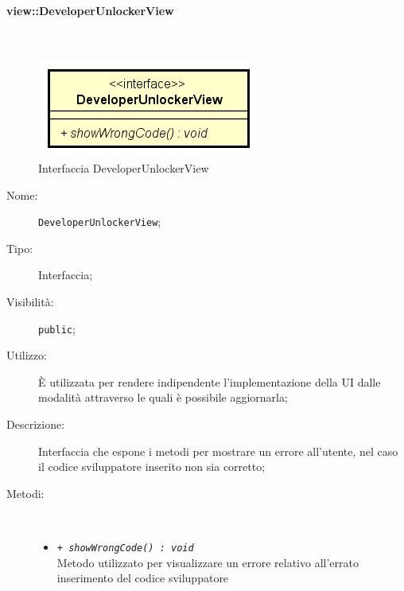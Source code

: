 \documentclass[../DefinizioneDiProdotto.tex]{subfiles}
\begin{document}
\paragraph{view::DeveloperUnlockerView}
\
\begin{figure}[H]
	\centering
	\includegraphics[width=\maxwidth]{img/DeveloperUnlockerView.png}
	\caption{Interfaccia DeveloperUnlockerView}\label{fig:view::DeveloperUnlockerView} 
\end{figure}
\begin{description}
	\item[Nome:] \texttt{DeveloperUnlockerView};
	\item[Tipo:] Interfaccia;
	\item[Visibilità:] \texttt{public};
	\item[Utilizzo:] È utilizzata per rendere indipendente l'implementazione della UI dalle modalità attraverso le quali è possibile aggiornarla;
	\item[Descrizione:] Interfaccia che espone i metodi per mostrare un errore all'utente, nel caso il codice sviluppatore inserito non sia corretto;
	\item[Metodi:] \
	\begin{itemize}
		\item \texttt{+ \textit{showWrongCode() : void}}\\
		Metodo utilizzato per visualizzare un errore relativo all'errato inserimento del codice sviluppatore
	\end{itemize}
\end{description}
\end{document}
